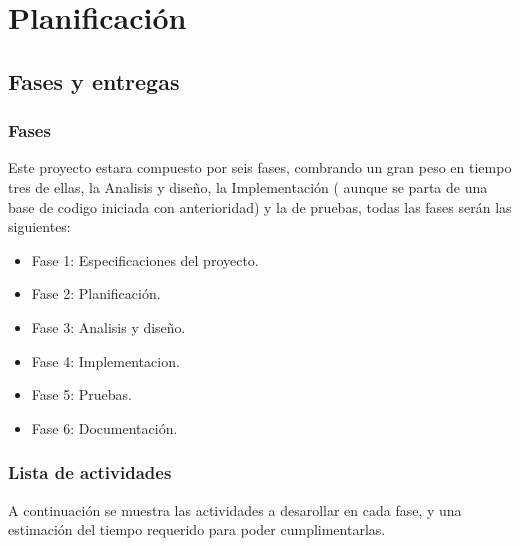 \chapter{Planificación}

\section {Fases y entregas}
\subsection {Fases}

Este proyecto estara compuesto por seis fases, combrando un gran peso en tiempo tres de ellas, la Analisis y diseño, la Implementación ( aunque se parta de una base de codigo iniciada con anterioridad) y la de pruebas, todas las fases serán las siguientes:

\begin{itemize}
  \item Fase 1: Especificaciones del proyecto.
  \item Fase 2: Planificación.
  \item Fase 3: Analisis y diseño.
  \item Fase 4: Implementacion.
  \item Fase 5: Pruebas.
  \item Fase 6: Documentación.
\end{itemize}

\subsection {Lista de actividades}
A continuación se muestra las actividades a desarollar en cada fase, y una estimación del tiempo requerido para poder cumplimentarlas.

